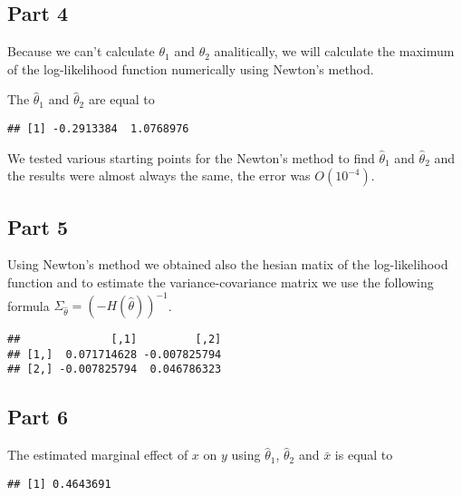 \documentclass[12pt, a4paper]{article}\usepackage[]{graphicx}\usepackage[]{color}
\makeatletter
\newenvironment{kframe}{%
 \def\at@end@of@kframe{}%
 \ifinner\ifhmode%
  \def\at@end@of@kframe{\end{minipage}}%
  \begin{minipage}{\columnwidth}%
 \fi\fi%
 \def\FrameCommand##1{\hskip\@totalleftmargin \hskip-\fboxsep
 \colorbox{shadecolor}{##1}\hskip-\fboxsep
     \hskip-\linewidth \hskip-\@totalleftmargin \hskip\columnwidth}%
 \MakeFramed {\advance\hsize-\width
   \@totalleftmargin\z@ \linewidth\hsize
   \@setminipage}}%
 {\par\unskip\endMakeFramed%
 \at@end@of@kframe}
\newenvironment{knitrout}{}{} %
\makeatother
\begin{document}
\subsection{Part 4}
Because we can't calculate $\theta_1$ and $\theta_2$ analitically, we will calculate the maximum of the log-likelihood function numerically using Newton's method.

The $\hat{\theta}_1$ and $\hat{\theta}_2$ are equal to
\begin{knitrout}
\color{fgcolor}\begin{kframe}
\begin{verbatim}
## [1] -0.2913384  1.0768976
\end{verbatim}
\end{kframe}
\end{knitrout}
We tested various starting points for the Newton's method to find $\hat{\theta}_1$ and $\hat{\theta}_2$ and the results were almost always the same, the error was $O(10^{-4})$.


\subsection{Part 5}
Using Newton's method we obtained also the hesian matix of the log-likelihood function and to estimate the variance-covariance matrix we use the following formula
$ \Sigma_{\hat{\theta}} = (-H(\hat{\theta}))^{-1}$.

\begin{knitrout}
\color{fgcolor}\begin{kframe}
\begin{verbatim}
##              [,1]         [,2]
## [1,]  0.071714628 -0.007825794
## [2,] -0.007825794  0.046786323
\end{verbatim}
\end{kframe}
\end{knitrout}



\subsection{Part 6}
The estimated marginal effect of $x$ on $y$ using $\hat{\theta}_1$, $\hat{\theta}_2$ and $\bar{x}$ is equal to
\begin{knitrout}
\color{fgcolor}\begin{kframe}
\begin{verbatim}
## [1] 0.4643691
\end{verbatim}
\end{kframe}
\end{knitrout}
\end{document}
